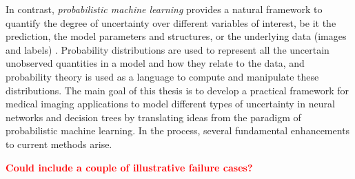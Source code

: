 In contrast, \textit{probabilistic machine learning} provides a natural framework to quantify the degree of uncertainty over different variables of interest, be it the prediction, the model parameters and structures, or the underlying data (images and labels) \cite{ghahramani2015probabilistic}. Probability distributions are used to represent all the uncertain unobserved quantities in a model and how they relate to the data, and probability theory is used as a language to compute and manipulate these distributions. The main goal of this thesis is to develop a practical framework for medical imaging applications to model different types of uncertainty in neural networks and decision trees by translating ideas from the paradigm of probabilistic machine learning. In the process, several fundamental enhancements to current methods arise. 

\textcolor{red}{\textbf{Could include a couple of illustrative failure cases? } }




%
%

